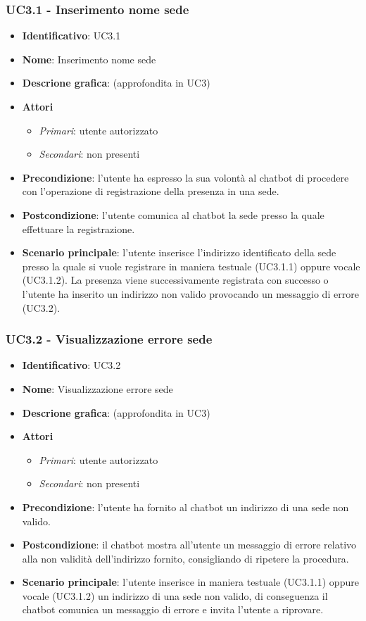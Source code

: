 \subsubsection{UC3.1 - Inserimento nome sede}
\begin{itemize}
    \item \textbf{Identificativo}: UC3.1
    \item \textbf{Nome}: Inserimento nome sede
    \item \textbf{Descrione grafica}: (approfondita in UC3)
    \item \textbf{Attori}
 \begin{itemize} 
    \item \textit{Primari}: utente autorizzato
    \item \textit{Secondari}: non presenti
 \end{itemize}
 \item \textbf{Precondizione}: l'utente ha espresso la sua volontà al chatbot di procedere con l'operazione di registrazione della presenza in una sede.
 \item \textbf{Postcondizione}: l'utente comunica al chatbot la sede presso la quale effettuare la registrazione.
 \item \textbf{Scenario principale}: l'utente inserisce l'indirizzo identificato della sede presso la quale si vuole registrare in maniera testuale (UC3.1.1) oppure vocale (UC3.1.2). La presenza viene successivamente registrata con successo o l'utente ha inserito un indirizzo non valido provocando un messaggio di errore (UC3.2). 
\end{itemize}

\subsubsection{UC3.2 - Visualizzazione errore sede}
\begin{itemize}
    \item \textbf{Identificativo}: UC3.2
    \item \textbf{Nome}: Visualizzazione errore sede
    \item \textbf{Descrione grafica}: (approfondita in UC3)
    \item \textbf{Attori}
 \begin{itemize} 
    \item \textit{Primari}: utente autorizzato
    \item \textit{Secondari}: non presenti
 \end{itemize}
 \item \textbf{Precondizione}: l'utente ha fornito al chatbot un indirizzo di una sede non valido.
 \item \textbf{Postcondizione}: il chatbot mostra all'utente un messaggio di errore relativo alla non validità dell'indirizzo fornito, consigliando di ripetere la procedura. 
 \item \textbf{Scenario principale}: l'utente inserisce in maniera testuale (UC3.1.1) oppure vocale (UC3.1.2) un indirizzo di una sede non valido, di conseguenza il chatbot comunica un messaggio di errore e invita l'utente a riprovare. 
\end{itemize}